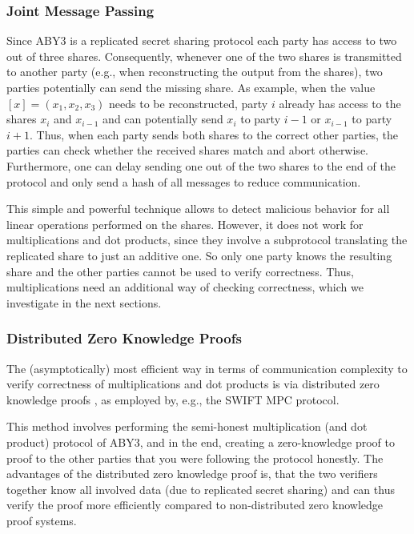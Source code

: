 \documentclass[a4paper,11pt,
]{article}
\newcommand{\shared}[1]{\ensuremath{[{#1}]}}
\begin{document}
\subsubsection{Joint Message Passing} \label{sec::jmp}

Since ABY3 is a replicated secret sharing protocol each party has access to two out of three shares. Consequently, whenever one of the two shares is transmitted to another party (e.g., when reconstructing the output from the shares), two parties potentially can send the missing share. As example, when the value $\shared{x} = (x_1, x_2, x_3)$ needs to be reconstructed, party $i$ already has access to the shares $x_i$ and $x_{i-1}$ and can potentially send $x_i$ to party $i-1$ or $x_{i-1}$ to party $i+1$. Thus, when each party sends both shares to the correct other parties, the parties can check whether the received shares match and abort otherwise. Furthermore, one can delay sending one out of the two shares to the end of the protocol and only send a hash of all messages to reduce communication.

This simple and powerful technique allows to detect malicious behavior for all linear operations performed on the shares. However, it does not work for multiplications and dot products, since they involve a subprotocol translating the replicated share to just an additive one. So only one party knows the resulting share and the other parties cannot be used to verify correctness. Thus, multiplications need an additional way of checking correctness, which we investigate in the next sections.

\subsubsection{Distributed Zero Knowledge Proofs} \label{sec::dzkp}

The (asymptotically) most efficient way in terms of communication complexity to verify correctness of multiplications and dot products is via distributed zero knowledge proofs \cite{DBLP:conf/ccs/BoyleGIN19}, as employed by, e.g., the SWIFT \cite{DBLP:conf/uss/KotiPPS21} MPC protocol.

This method involves performing the semi-honest multiplication (and dot product) protocol of ABY3, and in the end, creating a zero-knowledge proof to proof to the other parties that you were following the protocol honestly. The advantages of the distributed zero knowledge proof is, that the two verifiers together know all involved data (due to replicated secret sharing) and can thus verify the proof more efficiently compared to non-distributed zero knowledge proof systems.
\end{document}
